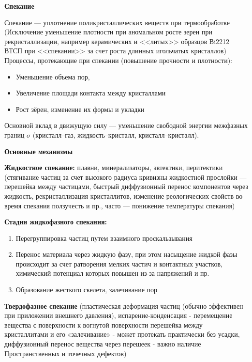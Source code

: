 \textbf{Спекание}

Спекание --- уплотнение поликристаллических веществ при термообработке (Исключение уменьшение плотности при аномальном росте зерен при рекристаллизации, например керамических и <<литых>> образцов Вi2212 ВТСП при <<спекании>> за счет роста длинных игольчатых кристаллов) Процессы, протекающие при спекании (повышение прочности и плотности):

\begin{itemize}
    \item Уменьшение объема пор,
    \item Увеличение площади контакта между кристаллами
    \item Рост зёрен, изменение их формы и укладки
\end{itemize}

Основной вклад в движущую силу --- уменьшение свободной энергии межфазных границ $\sigma$ (кристалл--газ, жидкость--кристалл, кристалл--кристалл).


\textbf{Основные механизмы}

\textbf{Жидкостное спекание:} плавни, минерализаторы, эвтектики, перитектики (стягивание частиц за счет высокого радиуса кривизны жидкостной прослойки --- перешейка между частицами, быстрый диффузионный перенос компонентов через жидкость, рекристаллизация кристаллитов, изменение реологических свойств во время спекания ползучесть и пр., часто --- понижение температуры спекания)

\textbf{Стадии жидкофазного спекания:}

\begin{enumerate}
    \item Перегруппировка частиц путем взаимного проскальзывания
    \item Перенос материала через жидкую фазу, при этом насыщение жидкой фазы происходит за счет ратворения мелких частич и контактных участков, химический потенциал которых повышен из-за напряжений и пр.
    \item Образование жесткого скелета, залечивание пор
\end{enumerate}

\textbf{Твердофазное спекание} (пластическая деформация частиц (обычно эффективен при приложении внешнего давления), испарение-конденсация - перемещение вещества с поверхности к вогнутой поверхности перешейка между кристаллитами и его «залечивание» - может протекать практически без усадки, диффузионный перенос вещества через перешеек - важно наличие Пространственных и точечных дефектов)

